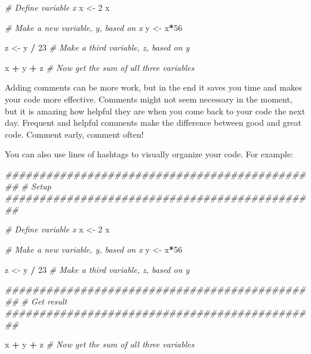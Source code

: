 \documentclass[
]{book}
\newenvironment{Shaded}{\begin{snugshade}}{\end{snugshade}}
\newcommand{\CommentTok}[1]{\textcolor[rgb]{0.56,0.35,0.01}{\textit{#1}}}
\newcommand{\DecValTok}[1]{\textcolor[rgb]{0.00,0.00,0.81}{#1}}
\newcommand{\NormalTok}[1]{#1}
\newcommand{\OperatorTok}[1]{\textcolor[rgb]{0.81,0.36,0.00}{\textbf{#1}}}
\newcommand{\StringTok}[1]{\textcolor[rgb]{0.31,0.60,0.02}{#1}}
\begin{document}
\begin{Shaded}
\begin{Highlighting}[]
\CommentTok{# Define variable x}
\NormalTok{x <-}\StringTok{ }\DecValTok{2} 
\NormalTok{x}

\CommentTok{# Make a new variable, y, based on x}
\NormalTok{y <-}\StringTok{ }\NormalTok{x}\OperatorTok{*}\DecValTok{56}

\NormalTok{z <-}\StringTok{ }\NormalTok{y }\OperatorTok{/}\StringTok{ }\DecValTok{23} \CommentTok{# Make a third variable, z, based on y}
 
\NormalTok{x }\OperatorTok{+}\StringTok{ }\NormalTok{y }\OperatorTok{+}\StringTok{ }\NormalTok{z }\CommentTok{# Now get the sum of all three variables}
\end{Highlighting}
\end{Shaded}

Adding comments can be more work, but in the end it saves you time and makes your code more effective. Comments might not seem necessary in the moment, but it is amazing how helpful they are when you come back to your code the next day. Frequent and helpful comments make the difference between good and great code. Comment early, comment often!

You can also use lines of hashtags to visually organize your code. For example:

\begin{Shaded}
\begin{Highlighting}[]
\CommentTok{##############################################}
\CommentTok{# Setup}
\CommentTok{##############################################}

\CommentTok{# Define variable x}
\NormalTok{x <-}\StringTok{ }\DecValTok{2} 
\NormalTok{x}

\CommentTok{# Make a new variable, y, based on x}
\NormalTok{y <-}\StringTok{ }\NormalTok{x}\OperatorTok{*}\DecValTok{56}

\NormalTok{z <-}\StringTok{ }\NormalTok{y }\OperatorTok{/}\StringTok{ }\DecValTok{23} \CommentTok{# Make a third variable, z, based on y}
 

\CommentTok{##############################################}
\CommentTok{# Get result}
\CommentTok{##############################################}

\NormalTok{x }\OperatorTok{+}\StringTok{ }\NormalTok{y }\OperatorTok{+}\StringTok{ }\NormalTok{z }\CommentTok{# Now get the sum of all three variables}
\end{Highlighting}
\end{Shaded}
\end{document}
